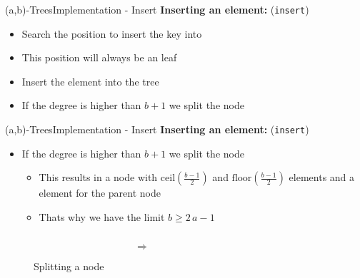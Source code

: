 
\begin{frame}{(a,b)-Trees}{Implementation - Insert}
  \textbf{Inserting an element:} (\texttt{\color{Mittel-Blau}insert})
  \begin{itemize}
    \item
      Search the position to insert the key into
    \item
      This position will always be an leaf
    \item
      Insert the element into the tree
    \item
      If the degree is higher than {\color{Mittel-Blau}$b+1$}
      we split the node
  \end{itemize}
\end{frame}


\begin{frame}{(a,b)-Trees}{Implementation - Insert}
  \textbf{Inserting an element:} (\texttt{\color{Mittel-Blau}insert})
  \begin{itemize}
    \item
      If the degree is higher than {\color{Mittel-Blau}$b+1$}
      we split the node
    \begin{itemize}
      \item
        This results in a node with
        {\color{Mittel-Blau}$\mathrm{ceil}\left(\frac{b-1}{2}\right)$} and
        {\color{Mittel-Blau}$\mathrm{floor}\left(\frac{b-1}{2}\right)$}
        elements and a element for the parent node
      \item
        Thats why we have the limit {\color{Mittel-Blau}$b \geq 2\,a - 1$}
    \end{itemize}
  \end{itemize}
  \begin{figure}
    \begin{columns}
      \begin{column}{0.35\linewidth}
        \begin{adjustbox}{width=\linewidth}
          
        \end{adjustbox}
      \end{column}
      \begin{column}{0.1\linewidth}
        \begin{center}
          $\Rightarrow$
        \end{center}
      \end{column}
      \begin{column}{0.35\linewidth}
        \begin{adjustbox}{width=\linewidth}
          
        \end{adjustbox}
      \end{column}
    \end{columns}
    \caption{Splitting a node}
    \label{fig:a_b_tree:insert_node_split}
  \end{figure}
\end{frame}

